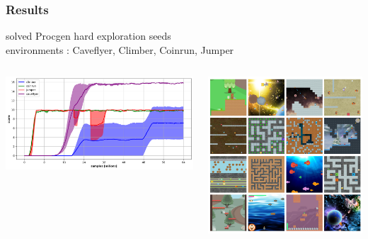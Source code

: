 \documentclass{beamer}
\begin{document}
\begin{frame}
  \frametitle{Results}
  
  {\Large solved Procgen hard exploration seeds} \\
  environments : Caveflyer, Climber, Coinrun, Jumper
  
  \begin{columns}
  
    \begin{column}{0.6\textwidth}
      \includegraphics[scale=0.25]{../results/summary/procgen_all_score.png}
    \end{column}

    \begin{column}{0.4\textwidth}
      \includegraphics[scale=0.25]{../images/procgen.png}
    \end{column}
  
  \end{columns}

\end{frame}
\end{document}
